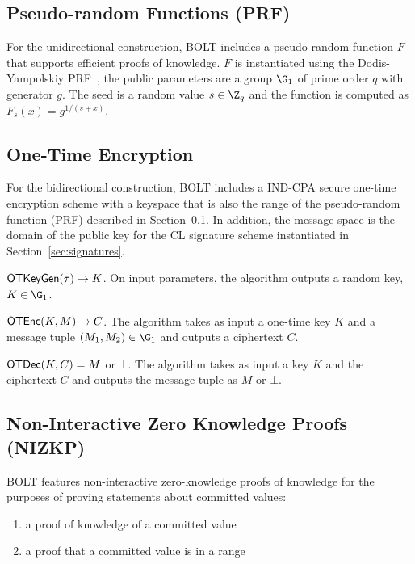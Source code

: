 \documentclass[11pt]{report}
\begin{document}
\subsection{Pseudo-random Functions (PRF)}
\label{sec:prf}

For the unidirectional construction, BOLT includes a pseudo-random function $F$ that supports efficient proofs of knowledge. $F$ is instantiated using the Dodis-Yampolskiy PRF~\cite{DY05}, the public parameters are a group $\G_1$ of prime order $q$ with generator $g$. The seed is a random value $s \in \Z_q$ and the function is computed as $F_{s}(x) = g^{1/(s+x)}$.
 
\subsection{One-Time Encryption} 
\label{sec:ote}

For the bidirectional construction, BOLT includes a IND-CPA secure one-time encryption scheme with a keyspace that is also the range of the pseudo-random function (PRF) described in Section~\ref{sec:prf}. In addition, the message space is the domain of the public key for the CL signature scheme instantiated in Section~\ref{sec:signatures}.

\medskip \noindent
${\sf OTKeyGen}(\tau) \rightarrow K$. On input parameters, the algorithm outputs a random key, $K \in \G_1$.

\medskip \noindent
${\sf OTEnc}(K, M) \rightarrow C$. The algorithm takes as input a one-time key $K$ and a message tuple $(M_1, M_2) \in \G_1$ and outputs a ciphertext $C$.
 
 \medskip \noindent
${\sf OTDec}(K, C) = M$ or $\bot$. The algorithm takes as input a key $K$ and the ciphertext $C$ and outputs the message tuple as $M$ or $\bot$.

\subsection{Non-Interactive Zero Knowledge Proofs (NIZKP)}
\label{sec:nizkp}

BOLT features non-interactive zero-knowledge proofs of knowledge for the purposes of proving statements about committed values: 
\begin{enumerate}
\item a proof of knowledge of a committed value
\item a proof that a committed value is in a range
\end{enumerate}
\end{document}
